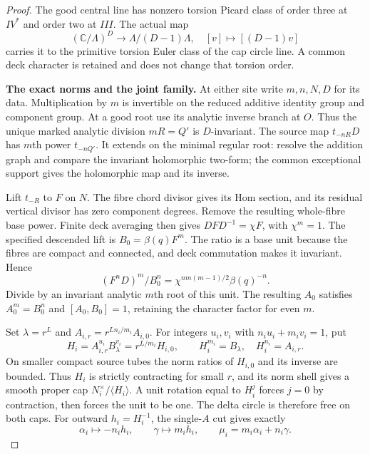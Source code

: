 \begin{proof}
The good central line has nonzero torsion Picard class of
order three at $IV^*$ and order two at $III$. The actual map
\[
 (\mathbb C/\Lambda)^D\longrightarrow\Lambda/(D-1)\Lambda,
                \quad[v]\longmapsto[(D-1)v]
\]
carries it to the primitive torsion Euler class of the cap
circle line. A common deck character is retained and does not
change that torsion order.

\par\medskip\noindent\textbf{The exact norms and the joint family.}
At either site write $m,n,N,D$ for its data. Multiplication by
$m$ is invertible on the reduced additive identity group and
component group. At a good root use its analytic inverse branch
at $O$. Thus the unique marked analytic division $mR=Q'$ is
$D$-invariant. The source map $t_{-nR}D$ has $m$th power
$t_{-nQ'}$. It extends on the minimal regular root: resolve the
addition graph and compare the invariant holomorphic two-form;
the common exceptional support gives the holomorphic map and
its inverse.

Lift $t_{-R}$ to $F$ on $N$. The fibre chord divisor gives its
Hom section, and its residual vertical divisor has zero
component degrees. Remove the resulting whole-fibre base power.
Finite deck averaging then gives
$DFD^{-1}=\chi F$, with $\chi^m=1$.
The specified descended lift is $B_0=\beta(q)F^m$.
The ratio is a base unit because the fibres are compact and
connected, and deck commutation makes it invariant. Hence
\[
       (F^nD)^m/B_0^n
          =\chi^{nm(m-1)/2}\beta(q)^{-n}.
\]
Divide by an invariant analytic $m$th root of this unit.
The resulting $A_0$ satisfies $A_0^m=B_0^n$ and
$[A_0,B_0]=1$, retaining the character factor for even $m$.

Set $\lambda=r^L$ and
$A_{i,r}=r^{Ln_i/m_i}A_{i,0}$. For integers $u_i,v_i$ with
$n_i u_i+m_i v_i=1$, put
\[
 H_i=A_{i,r}^{u_i}B_\lambda^{v_i}
       =r^{L/m_i}H_{i,0},\qquad
 H_i^{m_i}=B_\lambda,\quad H_i^{n_i}=A_{i,r}.                  \tag{F46.9}
\]
On smaller compact source tubes the norm ratios of $H_{i,0}$
and its inverse are bounded. Thus $H_i$ is strictly contracting
for small $r$, and its norm shell gives a smooth proper cap
$N_i^\times/\langle H_i\rangle$. A unit rotation equal to
$H_i^j$ forces $j=0$ by contraction, then forces the unit to
be one. The delta circle is therefore free on both caps.
For outward $h_i=H_i^{-1}$, the single-$A$ cut gives exactly
\[
 \alpha_i\longmapsto-n_i h_i,\qquad
 \gamma\longmapsto m_i h_i,\qquad
 \mu_i=m_i\alpha_i+n_i\gamma.                                 \tag{F46.10}
\]


\end{proof}
